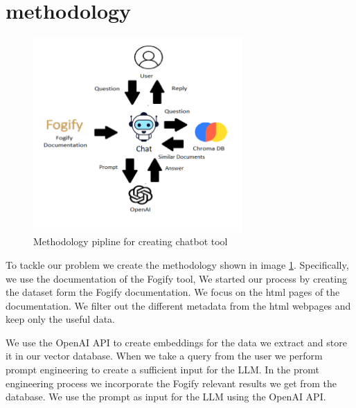 \section{methodology}
\label{sec:methodology}

\begin{figure}[h!]
    \includegraphics[width=8cm]{figures/methodology-pipline.png}
    \caption[Methodology pipline]{Methodology pipline for creating chatbot
        tool}
    \label{img:pipeline}
\end{figure}

To tackle our problem we create the methodology shown in image
\ref{img:pipeline}. Specifically, we use the documentation of the Fogify tool,
We started our process by creating the dataset form the Fogify documentation.
We focus on the html pages of the documentation. We filter out the different
metadata from the html webpages and keep only the useful data.

We use the OpenAI API to create embeddings for the data we extract and store it
in our vector database.
When we take a query from the user we perform prompt engineering to create a
sufficient
input for the LLM. In the promt engineering process we incorporate the Fogify
relevant results we get from the database. We use the prompt as input for the
LLM using the OpenAI API.

